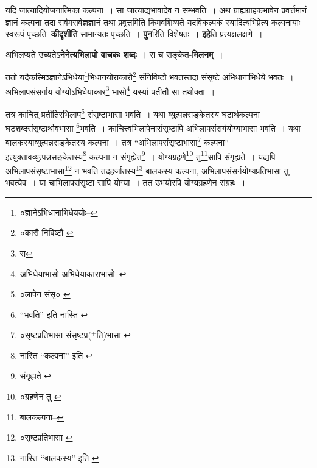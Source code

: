 \documentclass[article,12pt,a4paper]{memoir}
\newcommand{\add}[1]{($^{+}$#1)}
\begin{document}
	  \pstart यदि जात्यादियोजनात्मिका कल्पना । सा जात्याद्यभावादेव न सम्भवति । अथ ग्राह्यग्राहकभावेन प्रवर्त्तमानं ज्ञानं कल्पना तदा सर्वमसर्वज्ञज्ञानं तथा प्रवृत्तमिति किमवशिष्यते यदविकल्पकं स्यादित्यभिप्रेत्य कल्पनायाः स्वरूपं पृच्छति--\textbf{कीदृशीति} सामान्यतः पृच्छति । \textbf{पुन}रिति विशेषतः । \textbf{इहे}ति प्रत्यक्षलक्षणे ।
	\pend
      

	  \pstart अभिलप्यते उच्यतेऽ\textbf{नेनेत्यभिलापो वाचकः शब्दः} । स च सङ्केत-\textbf{मिलनम्} ।
	\pend
	  \bigskip
	  \begingroup
	

	  \pstart ततो यदैकस्मिञ्ज्ञानेऽभिधेया\footnote{०ज्ञानेऽभिधानाभिधेययोः--\cite{dp-msB}}\-भिधानयोराकारौ\footnote{०कारौ निविष्टौ \cite{dp-msB}} संनिविष्टौ भवतस्तदा संसृष्टे अभिधानाभिधेये भवतः । अभिलापसंसर्गाय योग्योऽभिधेयाकार\footnote{रा} भासो\footnote{अभिधेयाभासो \cite{dp-msA} \cite{dp-edP} \cite{dp-edH} \cite{dp-edE} अभिधेयाकाराभासो--\cite{dp-edN}} यस्यां प्रतीतौ सा तथोक्ता ।
	\pend
       

	  \pstart तत्र काचित् प्रतीतिरभिलाप\footnote{०लापेन संसृ० \cite{dp-msA} \cite{dp-edP} \cite{dp-edH} \cite{dp-edE} \cite{dp-edN}} संसृष्टाभासा भवति । यथा व्युत्पन्नसङ्केतस्य घटार्थकल्पना घटशब्दसंसृष्टार्थावभासा \footnote{“भवति” इति नास्ति \cite{dp-msB} \cite{dp-msD}}\-भवति । काचित्त्वभिलापेनासंसृष्टापि अभिलापसंसर्गयोग्याभासा भवति । यथा बालकस्याव्युत्पन्नसङ्केतस्य कल्पना । तत्र “अभिलापसंसृष्टाभासा\footnote{०सृष्टप्रतिभासा \cite{dp-msD} संसृष्टप्र\add{ति}भासा \cite{dp-msB}} कल्पना” इत्युक्तावव्युत्पन्नसङ्केतस्य\footnote{नास्ति “कल्पना” इति \cite{dp-msA} \cite{dp-msB} \cite{dp-edP} \cite{dp-edH} \cite{dp-edE} \cite{dp-edN}} कल्पना न संगृह्येत\footnote{संगृह्यते \cite{dp-msC}} । योग्यग्रहणे\footnote{०ग्रहणेन तु \cite{dp-msC}} तु\footnote{बालकल्पना--\cite{dp-msD-n}}\-सापि संगृह्यते । यद्यपि अभिलापसंसृष्टाभासा\footnote{०सृष्टप्रतिभासा \cite{dp-msC} \cite{dp-msA}} न भवति तदहर्जातस्य\footnote{नास्ति “बालकस्य” इति \cite{dp-msA} \cite{dp-edP} \cite{dp-edE}} बालकस्य कल्पना, अभिलापसंसर्गयोग्यप्रतिभासा तु भवत्येव । या चाभिलापसंसृष्टा सापि योग्या । तत उभयोरपि योग्यग्रहणेन संग्रहः ।
	\pend
      
	  \endgroup
	
\end{document}

